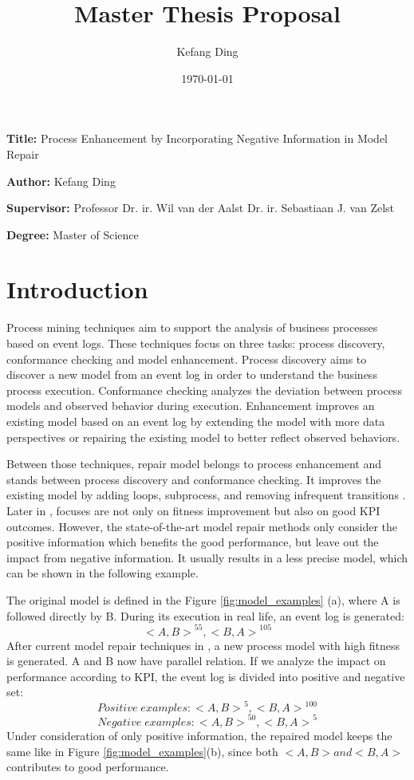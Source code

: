 \documentclass[12pt, a4paper]{article}
\title{Master Thesis Proposal}
\author{Kefang Ding}
\date{\today}
\newcommand{\namelistlabel}[1]{\mbox{#1}\hfil}
\newenvironment{namelist}[1]{%
\begin{list}{}
    {
        \let\makelabel\namelistlabel
        \settowidth{\labelwidth}{#1}
        \setlength{\leftmargin}{1.1\labelwidth}
    }
  }{%
\end{list}}
\begin{document}
\maketitle
\hrulefill
\begin{namelist}{xxxxxxxxxxxx}
\item[{\bf Title:}]
	Process Enhancement by Incorporating Negative Information in Model Repair
\item[{\bf Author:}]
	Kefang Ding
\item[{\bf Supervisor:}]
    Professor Dr. ir. Wil van der Aalst
    \newline
	Dr. ir. Sebastiaan J. van Zelst

\item[{\bf Degree:}]
	Master of Science
\end{namelist}
\hrulefill 

\section*{Introduction} 

Process mining techniques aim to support the analysis of business processes based on event logs. These techniques focus on three tasks: process discovery, conformance checking and model enhancement. Process discovery aims to discover a new model from an event log in order to understand the business process execution. Conformance checking analyzes the deviation between process models and observed behavior during execution. Enhancement improves an existing model based on an event log by extending the model with more data perspectives or repairing the existing model to better reflect observed behaviors.  

Between those techniques, repair model belongs to process enhancement and stands between process discovery and conformance checking. It improves the existing model by adding loops, subprocess, and removing infrequent transitions \cite{Fahland}. Later in \cite{Dees} \cite{Anja}, focuses are not only on fitness improvement but also on good KPI outcomes. However, the state-of-the-art model repair methods only consider the positive information which benefits the good performance, but leave out the impact from negative information. It usually results in a less precise model, which can be shown in the following example.
 
The original model is defined in the Figure \ref{fig:model_examples} (a), where A is followed directly by B. During its execution in real life, an event log is generated: \[{ <A, B> }^{55}  , {<B, A>}^{105} \] 
After current model repair techniques in \cite{Anja}\cite{Dees}, a new process model with high fitness is generated. A and B now have parallel relation. 
If we analyze the impact on performance according to KPI, the event log is divided into positive and negative set: 
\[ Positive \;  examples: { <A, B> }^{5}  , {<B, A>}^{100} \] 
\[ Negative \; examples: { <A, B> }^{50}  , {<B, A>}^{5} \]  
Under consideration of only positive information, the repaired model keeps the same like in Figure \ref{fig:model_examples}(b), since both $<A,B> and <B,A>$ contributes to good performance. 
\end{document}
